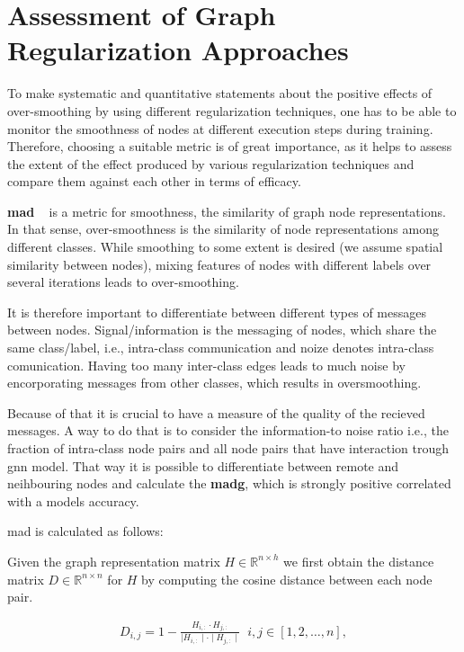\section{Assessment of Graph Regularization Approaches}
\label{sec:related:setup:choice:metrics}
To make systematic and quantitative statements about the positive effects of over-smoothing by using different regularization techniques, one has to be able to monitor the smoothness of nodes at different execution steps during training. Therefore, choosing a suitable metric is of great importance, as it helps to assess the extent of the effect produced by various regularization techniques and compare them against each other in terms of efficacy.

\textbf{\Ac{mad}} ~\cite{Chen2020} is a metric for smoothness, the similarity of graph node representations. In that sense, over-smoothness is the similarity of node representations among different classes. While smoothing to some extent is desired (we assume spatial similarity between nodes), mixing features of nodes with different labels over several iterations leads to over-smoothing.

It is therefore important to differentiate between different types of messages between nodes. Signal/information is the messaging of nodes, which share the same class/label, i.e., intra-class communication and noize denotes intra-class comunication. Having too many inter-class edges leads to much noise by encorporating messages from other classes, which results in oversmoothing.

Because of that it is crucial to have a measure of the quality of the recieved messages. A way to do that is to consider the information-to noise ratio i.e., the fraction of intra-class node pairs and all node pairs that have interaction trough \ac{gnn} model. That way it is possible to differentiate between remote and neihbouring nodes and calculate the \textbf{\ac{madg}}, which is strongly positive correlated with a models accuracy.

\ac{mad} is calculated as follows:

Given the graph representation matrix $H \in \mathbb{R}^{n \times h}$ we
first obtain the distance matrix $D \in \mathbb{R}^{n \times n}$ for $H$ by
computing the cosine distance between each node pair.

\begin{align*}
    D_{i,j} = 1 - \frac{H_{i,:} \cdot H_{j,:}}{\mid H_{i,:}\mid  \cdot \mid H_{j,:}\mid} \; \;  i,j \in [1,2, \dots, n],
\end{align*}

